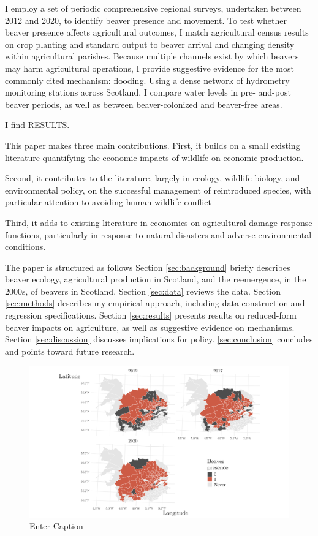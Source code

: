 I employ a set of periodic comprehensive regional surveys, undertaken between 2012 and 2020, to identify beaver presence and movement. To test whether beaver presence affects agricultural outcomes, I match agricultural census results on crop planting and standard output to beaver arrival and changing density within agricultural parishes. Because multiple channels exist by which beavers may harm agricultural operations, I provide suggestive evidence for the most commonly cited mechanism: flooding. Using a dense network of hydrometry monitoring stations across Scotland, I compare water levels in pre- and-post beaver periods, as well as between beaver-colonized and beaver-free areas.

I find RESULTS.

This paper makes three main contributions. First, it builds on a small existing literature quantifying the economic impacts of wildlife on economic production.

Second, it contributes to the literature, largely in ecology, wildlife biology, and environmental policy, on the successful management of reintroduced species, with particular attention to avoiding human-wildlife conflict

Third, it adds to existing literature in economics on agricultural damage response functions, particularly in response to natural disasters and adverse environmental conditions.

The paper is structured as follows Section \ref{sec:background} briefly describes beaver ecology, agricultural production in Scotland, and the reemergence, in the 2000s, of beavers in Scotland. Section \ref{sec:data} reviews the data. Section \ref{sec:methods} describes my empirical approach, including data construction and regression specifications. Section \ref{sec:results} presents results on reduced-form beaver impacts on agriculture, as well as suggestive evidence on mechanisms. Section \ref{sec:discussion} discusses implications for policy. \ref{sec:conclusion} concludes and points toward future research. 

\begin{figure}
    \centering
    \includegraphics[width=0.9\linewidth]{output//figures/beaver_parish_expansion.pdf}
    \caption{Enter Caption}
    \label{fig:enter-label}
\end{figure}


